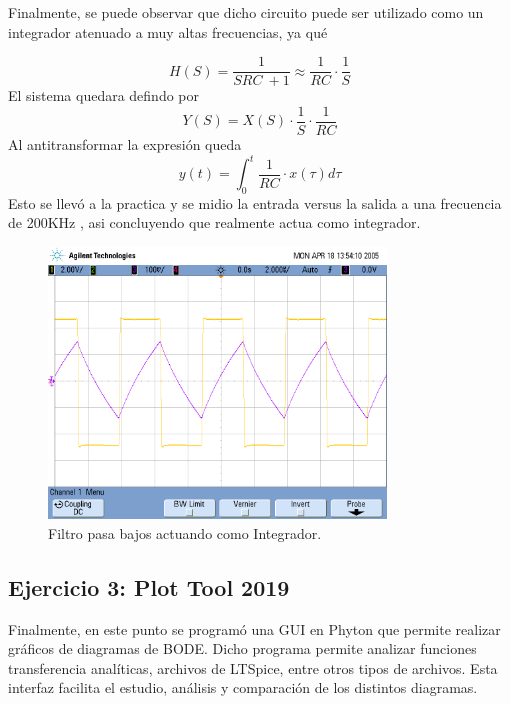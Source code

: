 \documentclass[a4paper]{article}
\begin{document}
Finalmente, se puede observar que dicho circuito puede ser utilizado como un integrador atenuado a muy altas frecuencias, ya qué

\begin{equation}
	H \left(S \right) = \frac{1}{SRC \ + 1} \approx \frac{1}{RC} \cdot \frac{1}{S}
\end{equation}
El sistema quedara defindo por 
\begin{equation}
	Y \left(S \right) = X \left(S \right) \cdot \frac{1}{S} \cdot \frac{1}{RC}
\end{equation}
Al antitransformar la expresión queda 
\begin{equation}
	y \left(t \right)=\int_{0}^{t} \frac{1}{RC}\cdot x(\tau) d\tau
\end{equation}
Esto se llevó a la practica y se midio la entrada versus la salida a una frecuencia  de  200KHz , asi concluyendo que realmente actua como integrador.
\begin{figure}[H]
	\centering
	\includegraphics[width=0.8\textwidth,trim={0.7cm 6.25cm  0 3.5cm},clip]{Integrando.png}
\caption{Filtro pasa bajos actuando como Integrador.}
	\label{fig:integrand}
\end{figure}
\subsection{Ejercicio 3: Plot Tool 2019}
Finalmente, en este punto se programó una GUI en Phyton que permite realizar gráficos de diagramas de BODE. Dicho programa permite analizar funciones transferencia analíticas, archivos de LTSpice, entre otros tipos de archivos. Esta interfaz facilita el estudio, análisis y comparación de los distintos diagramas.
\end{document}
